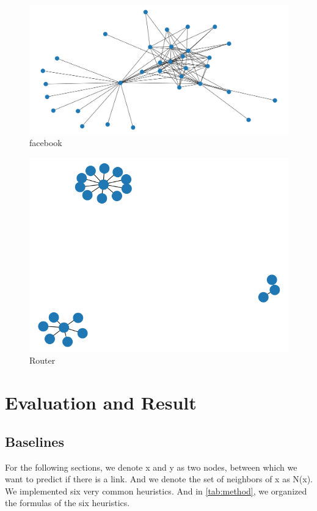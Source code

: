 \documentclass[12pt]{article}
\begin{document}
	
	\begin{figure}[h]
		\centering
		\includegraphics[scale=0.3]{Facebook}
		\caption{facebook}
		\label{fig:facebook}
	\end{figure}
	
	\begin{figure}[h]
		\centering
		\includegraphics[scale=0.3]{Router}
		\caption{Router}
		\label{fig:Router}
	\end{figure}
	\section{Evaluation and Result}
	
	\subsection{Baselines}
	For the following sections, we denote x and y as two nodes, between which we want to predict if there is a link. And we denote the set of neighbors of x as N(x). We implemented six very common heuristics. And in \ref{tab:method}, we organized the formulas of the six heuristics. \\
\end{document}
